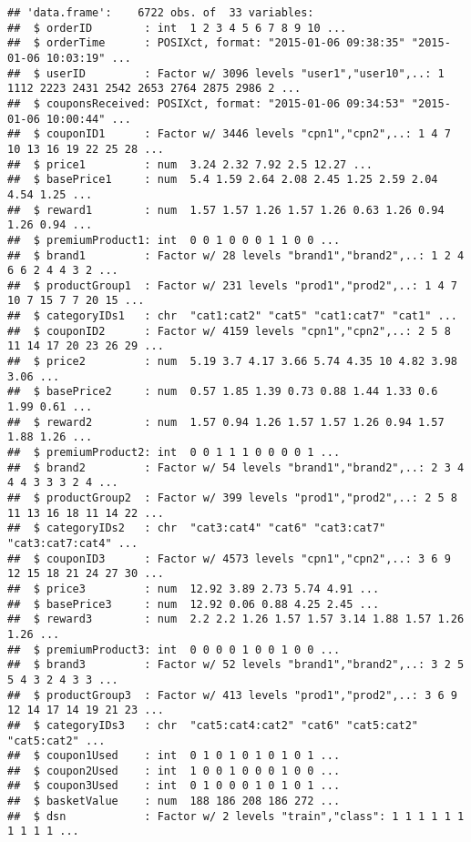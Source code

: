 \documentclass[10pt]{report}
\begin{document}
\begin{verbatim}
## 'data.frame':    6722 obs. of  33 variables:
##  $ orderID        : int  1 2 3 4 5 6 7 8 9 10 ...
##  $ orderTime      : POSIXct, format: "2015-01-06 09:38:35" "2015-01-06 10:03:19" ...
##  $ userID         : Factor w/ 3096 levels "user1","user10",..: 1 1112 2223 2431 2542 2653 2764 2875 2986 2 ...
##  $ couponsReceived: POSIXct, format: "2015-01-06 09:34:53" "2015-01-06 10:00:44" ...
##  $ couponID1      : Factor w/ 3446 levels "cpn1","cpn2",..: 1 4 7 10 13 16 19 22 25 28 ...
##  $ price1         : num  3.24 2.32 7.92 2.5 12.27 ...
##  $ basePrice1     : num  5.4 1.59 2.64 2.08 2.45 1.25 2.59 2.04 4.54 1.25 ...
##  $ reward1        : num  1.57 1.57 1.26 1.57 1.26 0.63 1.26 0.94 1.26 0.94 ...
##  $ premiumProduct1: int  0 0 1 0 0 0 1 1 0 0 ...
##  $ brand1         : Factor w/ 28 levels "brand1","brand2",..: 1 2 4 6 6 2 4 4 3 2 ...
##  $ productGroup1  : Factor w/ 231 levels "prod1","prod2",..: 1 4 7 10 7 15 7 7 20 15 ...
##  $ categoryIDs1   : chr  "cat1:cat2" "cat5" "cat1:cat7" "cat1" ...
##  $ couponID2      : Factor w/ 4159 levels "cpn1","cpn2",..: 2 5 8 11 14 17 20 23 26 29 ...
##  $ price2         : num  5.19 3.7 4.17 3.66 5.74 4.35 10 4.82 3.98 3.06 ...
##  $ basePrice2     : num  0.57 1.85 1.39 0.73 0.88 1.44 1.33 0.6 1.99 0.61 ...
##  $ reward2        : num  1.57 0.94 1.26 1.57 1.57 1.26 0.94 1.57 1.88 1.26 ...
##  $ premiumProduct2: int  0 0 1 1 1 0 0 0 0 1 ...
##  $ brand2         : Factor w/ 54 levels "brand1","brand2",..: 2 3 4 4 4 3 3 3 2 4 ...
##  $ productGroup2  : Factor w/ 399 levels "prod1","prod2",..: 2 5 8 11 13 16 18 11 14 22 ...
##  $ categoryIDs2   : chr  "cat3:cat4" "cat6" "cat3:cat7" "cat3:cat7:cat4" ...
##  $ couponID3      : Factor w/ 4573 levels "cpn1","cpn2",..: 3 6 9 12 15 18 21 24 27 30 ...
##  $ price3         : num  12.92 3.89 2.73 5.74 4.91 ...
##  $ basePrice3     : num  12.92 0.06 0.88 4.25 2.45 ...
##  $ reward3        : num  2.2 2.2 1.26 1.57 1.57 3.14 1.88 1.57 1.26 1.26 ...
##  $ premiumProduct3: int  0 0 0 0 1 0 0 1 0 0 ...
##  $ brand3         : Factor w/ 52 levels "brand1","brand2",..: 3 2 5 5 4 3 2 4 3 3 ...
##  $ productGroup3  : Factor w/ 413 levels "prod1","prod2",..: 3 6 9 12 14 17 14 19 21 23 ...
##  $ categoryIDs3   : chr  "cat5:cat4:cat2" "cat6" "cat5:cat2" "cat5:cat2" ...
##  $ coupon1Used    : int  0 1 0 1 0 1 0 1 0 1 ...
##  $ coupon2Used    : int  1 0 0 1 0 0 0 1 0 0 ...
##  $ coupon3Used    : int  0 1 0 0 0 1 0 1 0 1 ...
##  $ basketValue    : num  188 186 208 186 272 ...
##  $ dsn            : Factor w/ 2 levels "train","class": 1 1 1 1 1 1 1 1 1 1 ...
\end{verbatim}
\end{document}
